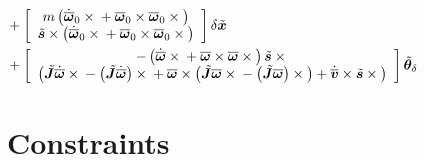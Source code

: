 \documentclass[10pt,fleqn,subeqn]{report}
\newcommand{\T}[1]{\bm{#1}}
\newcommand{\TT}[1]{\bm{#1}}
\begin{document}
\begin{align}
	\nonumber \\ & \hspace{-20mm}
	+ \sqbr{\matr{c}{
		m \plbr{
			\dot{\overline{\T{\omega}}}_0 \times{}
			+ \overline{\T{\omega}}_0 \times \overline{\T{\omega}}_0 \times{}
		} \\
		\tilde{\T{s}} \times \plbr{
			\dot{\overline{\T{\omega}}}_0 \times{}
			+ \overline{\T{\omega}}_0 \times \overline{\T{\omega}}_0 \times{}
		}
	}} \delta\tilde{\T{x}}
	\nonumber \\ & \hspace{-20mm}
	+ \sqbr{\matr{c}{
		- \plbr{
			\dot{\overline{\T{\omega}}} \times{}
			+ \overline{\T{\omega}} \times \overline{\T{\omega}} \times{}
		} \tilde{\T{s}}\times{} \\
		\plbr{
			\tilde{\TT{J}} \dot{\overline{\T{\omega}}} \times{}
			- \plbr{\tilde{\TT{J}} \dot{\overline{\T{\omega}}}} \times{}
			+ \overline{\T{\omega}} \times \plbr{
				\tilde{\T{J}} \overline{\T{\omega}} \times{}
				- \plbr{\tilde{\TT{J}} \overline{\T{\omega}}} \times{}
			}
			+ \dot{\overline{\T{v}}} \times \tilde{\T{s}} \times{}
		}
	}} \tilde{\T{\theta}}_{\delta}
\end{align}








\chapter{Constraints}
\end{document}
